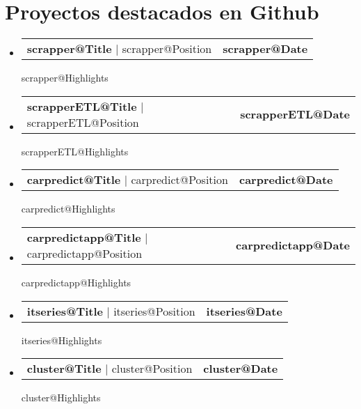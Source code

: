 \documentclass[letterpaper,11pt]{article}
\makeatletter
\newcommand{\resumeProjectHeading}[2]{
    \item
    \begin{tabular*}{1.001\textwidth}{l@{\extracolsep{\fill}}r}
      \small#1 & \textbf{\small #2}\\
    \end{tabular*}\vspace{-7pt}
}
\newcommand{\resumeSubHeadingListStart}{\begin{itemize}[leftmargin=0.0in, label={}]}
\newcommand{\resumeSubHeadingListEnd}{\end{itemize}}
\makeatother
\begin{document}
\newcommand{\renderHck}[1]{
      \resumeProjectHeading
      {\textbf{\csname #1@Title\endcsname} $|$ \csname #1@Position\endcsname}
      {\csname #1@Date\endcsname}
      \csname #1@Highlights\endcsname
}





\section{Proyectos destacados en Github}
\vspace{-5pt}
\resumeSubHeadingListStart
    \renderHck{scrapper}
    \vspace{-5pt}
    \renderHck{scrapperETL}
    \vspace{-5pt}
    \renderHck{carpredict}
    \vspace{-12pt}
    \renderHck{carpredictapp}
    \vspace{-12pt}
    \renderHck{itseries}
    \vspace{-12pt}
    \renderHck{cluster}
\resumeSubHeadingListEnd
\end{document}
